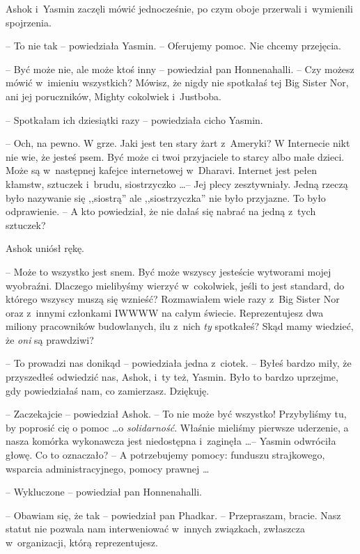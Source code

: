 \documentclass[oneside,polish,11pt,rmheadings]{mwbk}
\begin{document}
Ashok i~Yasmin zaczęli mówić jednocześnie, po czym oboje przerwali i~wymienili spojrzenia. 

-- To nie tak -- powiedziała Yasmin. -- Oferujemy pomoc. Nie chcemy przejęcia.

-- Być może nie, ale może ktoś inny -- powiedział pan Honnenahalli.  --  Czy możesz mówić w~imieniu wszystkich? Mówisz, że nigdy nie spotkałaś tej Big Sister Nor, ani jej poruczników, Mighty cokolwiek i~Justboba.

-- Spotkałam ich dziesiątki razy -- powiedziała cicho Yasmin.

-- Och, na pewno. W grze. Jaki jest ten stary żart z~Ameryki? W Internecie nikt nie wie, że jesteś psem. Być może ci twoi przyjaciele to starcy albo małe dzieci. Może są w~następnej kafejce internetowej w~Dharavi. Internet jest pełen kłamstw, sztuczek i~brudu, siostrzyczko \ldots  -- Jej plecy zesztywniały. Jedną rzeczą było nazywanie się ,,siostrą'' ale ,,siostrzyczka'' nie było przyjazne. To było odprawienie. -- A kto powiedział, że nie dałaś się nabrać na jedną z~tych sztuczek?

Ashok uniósł rękę. 

-- Może to wszystko jest snem. Być może wszyscy jesteście wytworami mojej wyobraźni. Dlaczego mielibyśmy wierzyć w~cokolwiek, jeśli to jest standard, do którego wszyscy muszą się wznieść? Rozmawiałem wiele razy z~Big Sister Nor oraz z~innymi członkami IWWWW na całym świecie. Reprezentujesz dwa miliony pracowników budowlanych, ilu z~nich \textit{ty} spotkałeś? Skąd mamy wiedzieć, że \textit{oni }są prawdziwi?

-- To prowadzi nas donikąd -- powiedziała jedna z~ciotek. -- Byłeś bardzo miły, że przyszedłeś odwiedzić nas, Ashok, i~ty też, Yasmin. Było to bardzo uprzejme, gdy powiedziałaś nam, co zamierzasz. Dziękuję.

-- Zaczekajcie -- powiedział Ashok. -- To nie może być wszystko! Przybyliśmy tu, by poprosić cię o pomoc  \ldots  o \textit{solidarność}. Właśnie mieliśmy pierwsze uderzenie, a nasza komórka wykonawcza jest niedostępna i~zaginęła \ldots  -- Yasmin odwróciła głowę. Co to oznaczało? -- A potrzebujemy pomocy: funduszu strajkowego, wsparcia administracyjnego, pomocy prawnej \ldots 

-- Wykluczone -- powiedział pan Honnenahalli.

-- Obawiam się, że tak -- powiedział pan Phadkar. -- Przepraszam, bracie. Nasz statut nie pozwala nam interweniować w~innych związkach, zwłaszcza w~organizacji, którą reprezentujesz.
\end{document}
